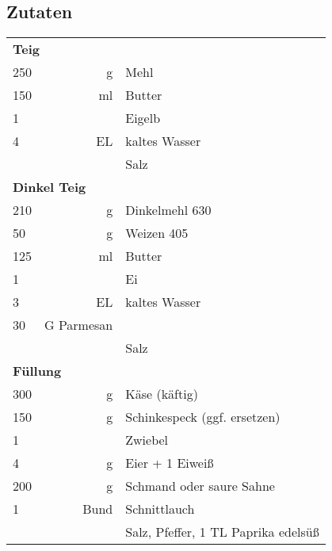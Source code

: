 \subsection*{Zutaten}
\begin{tabular}{lrl}
    \multicolumn{3}{l}{\textbf{Teig}}                      \\
    250 &          g & Mehl                                \\
    150 &         ml & Butter                              \\
    1   &            & Eigelb                              \\
    4   &         EL & kaltes Wasser                       \\
    &            & Salz                                \\
    \multicolumn{3}{l}{\textbf{Dinkel Teig}}               \\
    210 &          g & Dinkelmehl 630                      \\
    50  &          g & Weizen 405                          \\
    125 &         ml & Butter                              \\
    1   &            & Ei                                  \\
    3   &         EL & kaltes Wasser                       \\
    30  & G Parmesan &                                     \\
    &            & Salz                                \\
    
    \multicolumn{3}{l}{\textbf{Füllung}}                   \\
    300 &          g & Käse (käftig)                       \\
    150 &          g & Schinkespeck (ggf. ersetzen)        \\
    1   &            & Zwiebel                             \\
    4   &          g & Eier + 1 Eiweiß                     \\
    200 &          g & Schmand oder saure Sahne            \\
    1   &       Bund & Schnittlauch                        \\
    &            & Salz, Pfeffer, 1 TL Paprika edelsüß
\end{tabular} 
